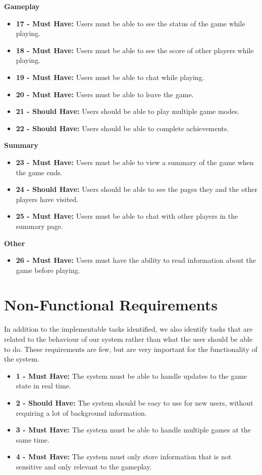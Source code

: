 \documentclass{l4proj}
\begin{document}
\textbf{Gameplay}
\begin{itemize}
    \item[] \textbf{17 - Must Have:} Users must be able to see the status of the game while playing.
    \item[] \textbf{18 - Must Have:} Users must be able to see the score of other players while playing.
    \item[] \textbf{19 - Must Have:} Users must be able to chat while playing.
    \item[] \textbf{20 - Must Have:} Users must be able to leave the game.
    \item[] \textbf{21 - Should Have:} Users should be able to play multiple game modes.
    \item[] \textbf{22 - Should Have:} Users should be able to complete achievements.
\end{itemize}

\textbf{Summary}
\begin{itemize}
    \item[] \textbf{23 - Must Have:}  Users must be able to view a summary of the game when the game ends.
    \item[] \textbf{24 - Should Have:} Users should be able to see the pages they and the other players have visited.
    \item[] \textbf{25 - Must Have:}  Users must be able to chat with other players in the summary page.
\end{itemize}

\textbf{Other}
\begin{itemize}
    \item[] \textbf{26 - Must Have:} Users must have the ability to read information about the game before playing.
\end{itemize}

\section{Non-Functional Requirements}
In addition to the implementable tasks identified, we also identify tasks that are related to the behaviour of our system rather than what the user should be able to do. These requirements are few, but are very important for the functionality of the system.  

\begin{itemize}
    \item[] \textbf{1 - Must Have:}  The system must be able to handle updates to the game state in real time.
    \item[] \textbf{2 - Should Have:} The system should be easy to use for new users, without requiring a lot of background information.
    \item[] \textbf{3 - Must Have:} The system must be able to handle multiple games at the same time.
    \item[] \textbf{4 - Must Have:} The system must only store information that is not sensitive and only relevant to the gameplay.
\end{itemize}
\end{document}
